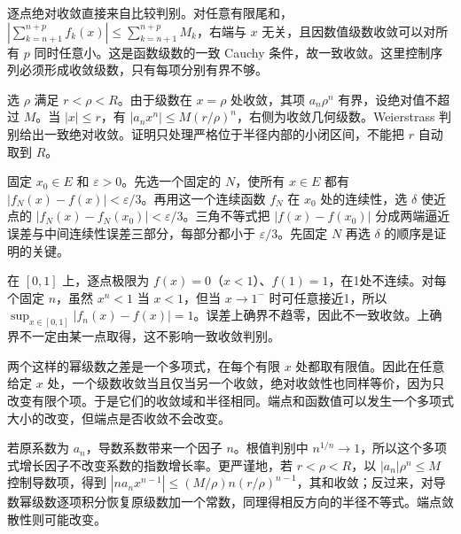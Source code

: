 \documentclass[UTF8,12pt,a4paper,fontset=fandol]{ctexart}
\begin{document}
\begin{solve}\label{ans:c29q11}
逐点绝对收敛直接来自比较判别。对任意有限尾和，$|\sum_{k=n+1}^{n+p}f_k(x)|\le\sum_{k=n+1}^{n+p}M_k$，右端与 $x$ 无关，且因数值级数收敛可以对所有 $p$ 同时任意小。这是函数级数的一致 Cauchy 条件，故一致收敛。这里控制序列必须形成收敛级数，只有每项分别有界不够。
\end{solve}

\begin{solve}\label{ans:c29q12}
选 $\rho$ 满足 $r<\rho<R$。由于级数在 $x=\rho$ 处收敛，其项 $a_n\rho^n$ 有界，设绝对值不超过 $M$。当 $|x|\le r$，有 $|a_nx^n|\le M(r/\rho)^n$，右侧为收敛几何级数。Weierstrass 判别给出一致绝对收敛。证明只处理严格位于半径内部的小闭区间，不能把 $r$ 自动取到 $R$。
\end{solve}

\begin{solve}\label{ans:c29q13}
固定 $x_0\in E$ 和 $\varepsilon>0$。先选一个固定的 $N$，使所有 $x\in E$ 都有 $|f_N(x)-f(x)|<\varepsilon/3$。再用这一个连续函数 $f_N$ 在 $x_0$ 处的连续性，选 $\delta$ 使近点的 $|f_N(x)-f_N(x_0)|<\varepsilon/3$。三角不等式把 $|f(x)-f(x_0)|$ 分成两端逼近误差与中间连续性误差三部分，每部分都小于 $\varepsilon/3$。先固定 $N$ 再选 $\delta$ 的顺序是证明的关键。
\end{solve}

\begin{solve}\label{ans:c29q14}
在 $[0,1]$ 上，逐点极限为 $f(x)=0$（$x<1$）、$f(1)=1$，在1处不连续。对每个固定 $n$，虽然 $x^n<1$ 当 $x<1$，但当 $x\to1^-$ 时可任意接近1，所以 $\sup_{x\in[0,1]}|f_n(x)-f(x)|=1$。误差上确界不趋零，因此不一致收敛。上确界不一定由某一点取得，这不影响一致收敛判别。
\end{solve}

\begin{solve}\label{ans:c29q15}
两个这样的幂级数之差是一个多项式，在每个有限 $x$ 处都取有限值。因此在任意给定 $x$ 处，一个级数收敛当且仅当另一个收敛，绝对收敛性也同样等价，因为只改变有限个项。于是它们的收敛域和半径相同。端点和函数值可以发生一个多项式大小的改变，但端点是否收敛不会改变。
\end{solve}

\begin{solve}\label{ans:c29q16}
若原系数为 $a_n$，导数系数带来一个因子 $n$。根值判别中 $n^{1/n}\to1$，所以这个多项式增长因子不改变系数的指数增长率。更严谨地，若 $r<\rho<R$，以 $|a_n|\rho^n\le M$ 控制导数项，得到 $|na_nx^{n-1}|\le(M/\rho)n(r/\rho)^{n-1}$，其和收敛；反过来，对导数幂级数逐项积分恢复原级数加一个常数，同理得相反方向的半径不等式。端点敛散性则可能改变。
\end{solve}
\end{document}
